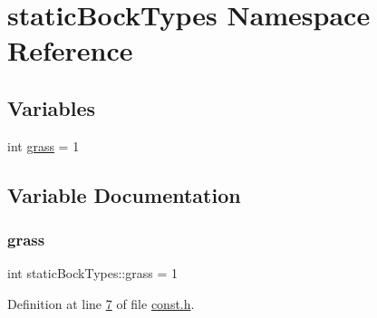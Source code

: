 \hypertarget{a00116}{}\section{static\+Bock\+Types Namespace Reference}
\label{a00116}
\subsection*{Variables}
\begin{DoxyCompactItemize}
\item 
int \hyperlink{a00116_a6dfdff0673d9c105ab375a71621be666}{grass} = 1
\end{DoxyCompactItemize}


\subsection{Variable Documentation}
\mbox{\label{a00116_a6dfdff0673d9c105ab375a71621be666}} 
\subsubsection{\texorpdfstring{grass}{grass}}
{\footnotesize\ttfamily int static\+Bock\+Types\+::grass = 1}



Definition at line \hyperlink{a00086_source_l00007}{7} of file \hyperlink{a00086_source}{const.\+h}.

